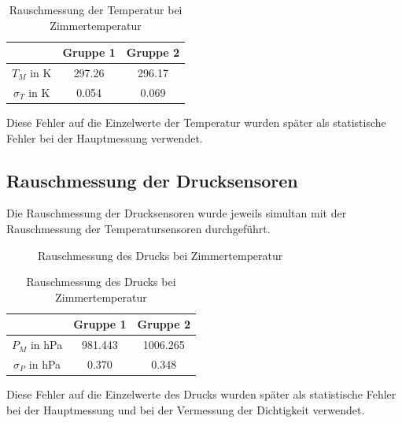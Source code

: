 \documentclass[12pt,a4paper]{article}
\begin{document}
\begin{table}[H]\centering
\caption{Rauschmessung der Temperatur bei Zimmertemperatur}
\begin{tabular}{c|c|c}
 & Gruppe 1 & Gruppe 2 \\ 
\hline 
$T_M$ in K & 297.26 & 296.17 \\ 
$\sigma_T$ in K & 0.054 & 0.069 \\  
\end{tabular} 
\end{table}

Diese Fehler auf die Einzelwerte der Temperatur wurden später als statistische Fehler bei der Hauptmessung verwendet.
\subsection{Rauschmessung der Drucksensoren}
Die Rauschmessung der Drucksensoren wurde jeweils simultan mit der Rauschmessung der Temperatursensoren durchgeführt.


\begin{figure}[H]
\caption{Rauschmessung des Drucks bei Zimmertemperatur}
\end{figure}

\begin{table}[H]\centering
\caption{Rauschmessung des Drucks bei Zimmertemperatur}
\begin{tabular}{c|c|c}
 & Gruppe 1 & Gruppe 2 \\ 
\hline 
$P_M$ in hPa & 981.443 & 1006.265 \\ 
$\sigma_P$ in hPa & 0.370 & 0.348 \\  
\end{tabular} 
\end{table}

Diese Fehler auf die Einzelwerte des Drucks wurden später als statistische Fehler bei der Hauptmessung und bei der Vermessung der Dichtigkeit verwendet.
\end{document}
